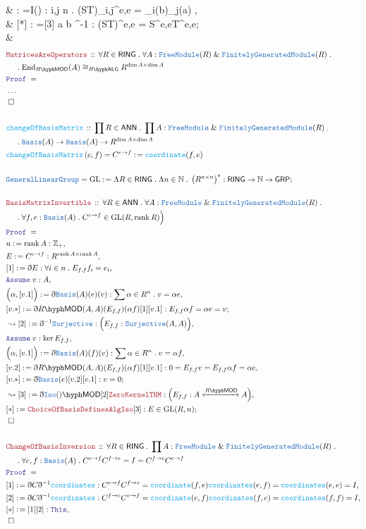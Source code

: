 \documentclass[12pt]{scrartcl}
\newcommand{\TYPE}[1]{\textcolor{NavyBlue}{\mathtt{#1}}}
\newcommand{\FUNC}[1]{\textcolor{Cerulean}{\mathtt{#1}}}
\newcommand{\LOGIC}[1]{\textcolor{Blue}{\mathtt{#1}}}
\newcommand{\THM}[1]{\textcolor{Maroon}{\mathtt{#1}}}
\renewcommand{\.}{\; . \;}
\newcommand{\de}{: \kern 0.1pc =}
\newcommand{\Act}[1]{\left(#1\right)}
\newcommand{\Theorem}[2]{& \THM{#1} \, :: \, #2 \\ & \Proof = \\ }
\newcommand{\DeclareFunc}[2]{& \FUNC{#1} \, :: \, #2 \\}
\newcommand{\DefineNamedFunc}[4]{&  \FUNC{#1}\Act{#2} = #3 \de #4 \\}
\newcommand{\NewLine}{\\ & \kern 1pc}
\newcommand{\Page}[1]{ \begin{align*} #1 \end{align*}   }
\newcommand{ \bd }{ \ByDef }
\newcommand{\NoProof}{ & \ldots \\ \EndProof}
\renewcommand{\And}{\; \& \;}
\newcommand{\Int}{\mathbb{Z} }
\newcommand{\Nat}{\mathbb{N} }
\newcommand{\End}{\mathrm{End}}
\newcommand{\Say}[3]{& #1 \de #2 : #3, \\}
\newcommand{\Conclude}[3]{& #1 \de #2 : #3; \\}
\newcommand{\Derive}[3]{& \leadsto #1 \de #2 : #3, \\}
\newcommand{\Assume}[2]{& \LOGIC{Assume} \; #1 : #2, \\}
\newcommand{\QED}{\; \square}
\newcommand{\EndProof}{& \QED \\}
\newcommand{\ByDef}{\eth}
\newcommand{\Proof}{\LOGIC{Proof} \; }
\newcommand{\ToIso}[1]{\xleftrightarrow{#1}}
\newcommand{\C}{\mathcal{C}}
\newcommand{\R}{\mathcal{R}}
\DeclareMathOperator{\rank}{rank}
\newcommand{\GRP}{\mathsf{GRP}}
\newcommand{\FGM}{\TYPE{FinitelyGeneratedModule}}
\newcommand{\FM}{\TYPE{FreeModule}}
\newcommand{\GL}{\mathrm{GL}}
\newcommand{\LMOD}[1]{#1\hyph\mathsf{MOD}}
\newcommand{\RING}{\mathsf{RING}}
\newcommand{\ANN}{\mathsf{ANN}}
\newcommand{\LALG}[1]{#1\hyph\mathsf{ALG}}
\begin{document}
{	\Derive{[3]}{I(\forall)}{\forall i,j \in n \.   (ST)_{i,j}^{e,e} = \R_i(b)\C_j(a) }
	\Conclude{[*]}{[3]\bd a \bd b \bd^{-1}\FUNC{matrixOfOperator}}{(ST)^{e,e} = S^{e,e}T^{e,e}}
	\EndProof
}\Page{
	\Theorem{MatricesAreOperators}{
		\forall R \in \RING \.  
		\forall A : \FM(R) \And \FGM(R) \. \NewLine \.  
		\End_{\LMOD{R}}(A) \cong_{\LALG{R}} R^{\dim A \times \dim A} 
	}
	\NoProof
	\\
	\DeclareFunc{changeOfBasisMatrix}{\prod R \in \ANN \.\prod A : \FM \And \FGM(R) \. \NewLine \.  
		\TYPE{Basis}(A) \to \TYPE{Basis}(A) \to R^{\dim A \times \dim A}
	}
	\DefineNamedFunc{changeOfBasisMatrix}{e,f}{C^{e \to f}}
	{ \FUNC{coordinate}(f,e) }
	\\
	\Conclude{\TYPE{GeneralLinearGroup} = \GL}{\Lambda R \in \RING \. \Lambda n \in \Nat \. \left(R^{n \times n}\right)^*}
	{ \RING \to \Nat \to \GRP}
	\\
	\Theorem{BasisMatrixInvertible}{
		\forall R \in \ANN \.  
		\forall A : \FM \And \FGM(R) \. \NewLine \.
		\forall f,e : \TYPE{Basis}(A) \. 
		C^{e \to f} \in \GL(R,\rank  R) \Big)
		}
	\Say{n}{\rank A}{\Int_+}
	\Say{E}{ C^{e \to f}}{R^{\rank A \times \rank A}}
	\Say{[1]}{\bd E}{\forall i \in n \. E_{f,f} f_i = e_i }
	\Assume{v}{A} 
	\Say{\Big( \alpha, [v.1] \Big)}{\bd \TYPE{Basis}(A)(e)(v)}{ \sum \alpha \in R^n \.  v = \alpha e}
	\Conclude{[v.*]}{ \bd \LMOD{R}(A,A)(E_{f,f})(\alpha f)[1][v.1] }{E_{f,f} \alpha f = \alpha e = v}
	\Derive{[2]}{\bd^{-1} \TYPE{Surjective}}{\Big(E_{f,f} : \TYPE{Surjective}(A,A)\Big)}
	\Assume{v}{\ker E_{f,f}}
	\Say{\Big( \alpha, [v.1] \Big)}{\bd \TYPE{Basis}(A)(f)(v)}{ \sum \alpha \in R^n \.  v = \alpha f}
	\Say{[v.2]}{ \bd \LMOD{R}(A,A)(E_{f,f})(\alpha f)[1][v.1] }{ 0 = E_{f,f}v = E_{f,f} \alpha f = \alpha e}
	\Conclude{[v.*]}{\bd \TYPE{Basis}(e)[v.2][v.1]}{v = 0 }
	\Derive{[3]}{\bd \TYPE{Iso}(\LMOD) [2] \THM{ZeroKernelTHM}}{ \Big(E_{f,f} : A \ToIso{\LMOD{R}} A\Big)}
	\Conclude{[*]}{\THM{ChoiceOfBasisDefinesAlgIso}[3]}{E \in \GL(R,n)}
	\EndProof
	\\
	\Theorem{ChangeOfBasisInversion}{\forall R \in \RING \. \prod A : \FM \And \FGM(R) \. \NewLine \. 
		\forall e,f : \TYPE{Basis}(A) \. C^{e \to f} C^{f \to e} = I = C^{f \to e}C^{e \to f}
	}
	\Say{[1]}{\bd C \bd^{-1}\FUNC{coordinates}}{  C^{e \to f}C^{f \to e} = \FUNC{coordinate}(f,e)\FUNC{coordinates}(e,f) = \FUNC{coordinates}(e,e) = I  }
	\Say{[2]}{\bd C \bd^{-1}\FUNC{coordinates}}{  C^{f \to e}C^{e \to f} = \FUNC{coordinate}(e,f)\FUNC{coordinates}(f,e) = \FUNC{coordinates}(f,f) = I  }
	\Say{[*]}{[1][2]}{\LOGIC{This} }
	\EndProof
}\Page{
}
\end{document}
